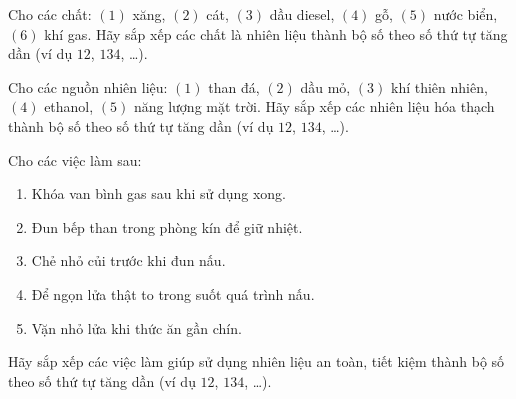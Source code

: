 \documentclass[Main.tex]{subfiles}
\begin{document}
\begin{ex}%
	Cho các chất: $(1)$ xăng, $(2)$ cát, $(3)$ dầu diesel, $(4)$ gỗ, $(5)$ nước biển, $(6)$ khí gas. Hãy sắp xếp các chất là nhiên liệu thành bộ số theo số thứ tự tăng dần (ví dụ $12$, $134$, …).
\end{ex}

\begin{ex}%
	Cho các nguồn nhiên liệu: $(1)$ than đá, $(2)$ dầu mỏ, $(3)$ khí thiên nhiên, $(4)$ ethanol, $(5)$ năng lượng mặt trời. Hãy sắp xếp các nhiên liệu hóa thạch thành bộ số theo số thứ tự tăng dần (ví dụ $12$, $134$, …).
\end{ex}

\begin{ex}%
	Cho các việc làm sau:
	\begin{enumerate}[(1)]
		\item Khóa van bình gas sau khi sử dụng xong.
		\item Đun bếp than trong phòng kín để giữ nhiệt.
		\item Chẻ nhỏ củi trước khi đun nấu.
		\item Để ngọn lửa thật to trong suốt quá trình nấu.
		\item Vặn nhỏ lửa khi thức ăn gần chín.
	\end{enumerate}
	Hãy sắp xếp các việc làm giúp sử dụng nhiên liệu an toàn, tiết kiệm thành bộ số theo số thứ tự tăng dần (ví dụ $12$, $134$, …).
\end{ex}
\end{document}
